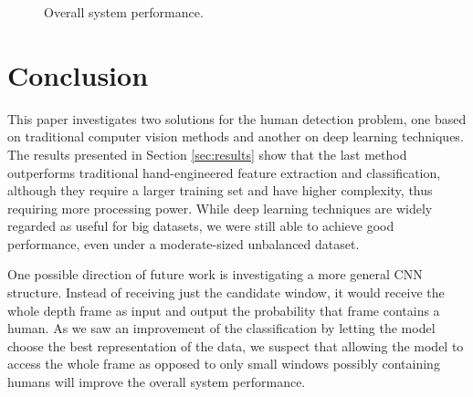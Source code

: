     \begin{figure*}[!t]
    \centering
    \label{fig:result-system-all}
    \hfil
    \label{fig:result-system-all-zoom}
    \caption{Overall system performance.}
    \label{fig:result-system}
    \end{figure*}

\section{Conclusion}
\label{sec:conclusion}

    This paper investigates two solutions for the human detection problem, one based on traditional computer vision methods and another on deep learning techniques. The results presented in Section \ref{sec:results} show that the last method outperforms traditional hand-engineered feature extraction and classification, although they require a larger training set and have higher complexity, thus requiring more processing power. While deep learning techniques are widely regarded as useful for big datasets, we were still able to achieve good performance, even under a moderate-sized unbalanced dataset.

    One possible direction of future work is investigating a more general CNN structure. Instead of receiving just the candidate window, it would receive the whole depth frame as input and output the probability that frame contains a human. As we saw an improvement of the classification by letting the model choose the best representation of the data, we suspect that allowing the model to access the whole frame as opposed to only small windows possibly containing humans will improve the overall system performance.
